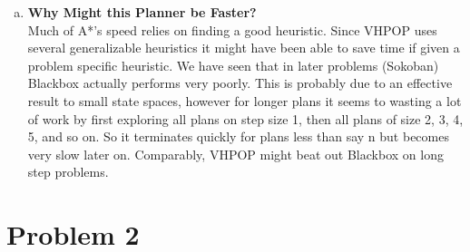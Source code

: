 \documentclass[]{article}
\begin{document}
\begin{enumerate}[(a)]
	\item \textbf{Why Might this Planner be Faster?}\\ 
	Much of A*'s speed relies on finding a good heuristic. Since VHPOP uses several generalizable heuristics it might have been able to save time if given a problem specific heuristic. We have seen that in later problems (Sokoban) Blackbox actually performs very poorly. This is probably due to an effective result to small state spaces, however for longer plans it seems to wasting a lot of work by first exploring all plans on step size 1, then all plans of size 2, 3, 4, 5, and so on. So it terminates quickly for plans less than say n but becomes very slow later on. Comparably, VHPOP might beat out Blackbox on long step problems.
	
	\end{enumerate}
\section{Problem 2}
\end{document}
